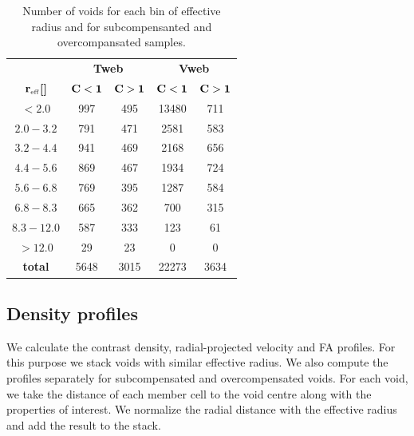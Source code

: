 \documentclass[a4,useAMS,usenatbib,usegraphicx]{mn2e}
\newcommand{\hMpc}{{\ifmmode{h^{-1}{\rm Mpc}}\else{$h^{-1}$Mpc}\fi}}
\newcommand{\reff}{{\ifmmode{r_{\mbox{\tiny eff}}}\else{$r_{\mbox{\tiny eff}}$}\fi}}
\begin{document}
\begin{table}[!htbp]
\centering
\begin{tabular}{c | c c | c c}
\toprule
\multicolumn{1}{c}{}&  \multicolumn{2}{c}{\textbf{Tweb}} & \multicolumn{2}{c}{\textbf{Vweb}}\\
\textbf{${\bf \reff }$[\hMpc]}   & $\bf{C<1}$   & $\bf{C>1}$    & $\bf{C<1}$   & $\bf{C>1}$\\ \hline
$<2.0$        &  997 & 495   & 13480  & 711\\
$2.0-3.2$     &  791 & 471   & 2581   & 583\\
$3.2-4.4$     &  941 & 469   & 2168   & 656\\
$4.4-5.6$     &  869 & 467   & 1934   & 724\\
$5.6-6.8$     &  769 & 395   & 1287   & 584\\
$6.8-8.3$     &  665 & 362   & 700    & 315\\
$8.3-12.0$    &  587 & 333   & 123    & 61\\
$>12.0$       &  29  & 23    & 0      & 0\\ \hline
\textbf{total}& 5648 & 3015  & 22273  & 3634\\
\bottomrule
\end{tabular}
\caption{Number of voids for each bin of effective radius and for 
subcompensanted and overcompansated samples.}
\label{tab:number_voids}
\end{table}



\subsection{Density profiles}
\label{subsec:density_voids}


We calculate the contrast density, radial-projected velocity and 
FA profiles. 
For this purpose we stack voids with similar effective radius.
We also compute the profiles separately  for subcompensated and
overcompensated voids. 
For each void,  
we take the distance of each member cell to the void centre along with the 
properties of interest. 
We normalize the radial distance with the effective radius and add the
result to the stack.
\end{document}
